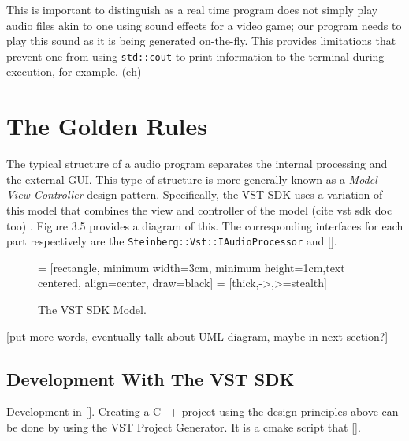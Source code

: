 This is important to distinguish as a real time program does not simply play audio files akin to one using sound effects for a video game; our program needs to play this sound as it is being generated on-the-fly. This provides limitations that prevent one from using \verb|std::cout| to print information to the terminal during execution, for example. (eh)

\section{The Golden Rules}
The typical structure of a audio program separates the internal processing and the external GUI. This type of structure is more generally known as a \textit{Model View Controller} design pattern. Specifically, the VST SDK uses a variation of this model that combines the view and controller of the model (cite vst sdk doc too) \cite{Bucanek2009}. Figure 3.5 provides a diagram of this. The corresponding interfaces for each part respectively are the \verb|Steinberg::Vst::IAudioProcessor|  and [].

\begin{figure}[h] %
	 = [rectangle, minimum width=3cm, minimum height=1cm,text centered, align=center, draw=black]
	 = [thick,->,>=stealth]
	\begin{center}
		\caption{The VST SDK Model.}
	\end{center}
\end{figure}

[put more words, eventually talk about UML diagram, maybe in next section?]

\subsection{Development With The VST SDK}
Development in []. Creating a C++ project using the design principles above can be done by using the VST Project Generator. It is a cmake script that [].


